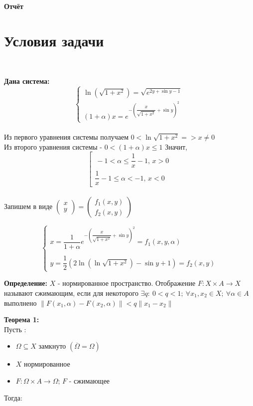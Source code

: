 \documentclass[a4paper,12pt]{article}
\begin{document}
\begin{center}
\sc\bfseries\Huge Отчёт \\
\end{center}

\section{Условия задачи} \

{\bf Дана система:}
\[
\begin{cases}
\ln(\sqrt{1+x^2}) = \sqrt{e^{2y + \sin{y} - 1}}\\
(1+\alpha)x = e^{-\left( \dfrac{x}{\sqrt{1 + x^2}} + \sin{y} \right)^2}
\end{cases}
\]
\\
Из первого уравнения системы получаем $0<\ln{\sqrt{1+x^2}} => x \ne 0$\\
Из второго уравнения системы - $0<(1+\alpha)x \le 1$
Значит,
\[\left[
\begin{gathered}\,-1 <\alpha \leq \dfrac{1}{x}-1, \, x >0\\ \dfrac{1}{x}-1\leq \alpha <-1, \, x <0\end{gathered}
\right.\]
\\
Запишем в виде 
$
\left(
\begin{smallmatrix}
x \\ y
\end{smallmatrix}
\right)
=
\left(
\begin{smallmatrix}
f_1 (x,y) \\ f_2 (x,y)
\end{smallmatrix}
\right)
$

\[  
\begin{cases}
x = \dfrac{1}{1+\alpha} e^{- \left( \dfrac{x}{\sqrt{1+x^2}} + \sin{y} \right )^2} = f_1 (x,y, \alpha)\\ 
\\
y = \dfrac12 \left( 2\ln{\left( \ln{\sqrt{1+x^2}} \right)} - \sin{y} + 1 \right) = f_2 (x,y)
\end{cases}
\]

{\bf Определение:} $X$ - нормированное пространство. Отображение 
$F:X \times A \to X$ называют сжимающим, если для некоторого $\exists q:\ 0<q<1;\  \forall x_1,x_2 \in X;\ \forall \alpha \in A$  выполнено 
$\|F(x_1,\alpha) - F(x_2,\alpha)\|<q\|x_1 - x_2\|$

{\bf Теорема 1:} \\ 
Пусть :	
\begin{itemize}
\item $\Omega\subseteq X $ замкнуто $(\overline{\Omega}=\Omega)$
\item $X$ нормированное
\item $F:\Omega\times A \to \Omega$; $F$ - сжимающее
\end{itemize}
Тогда:
\end{document}
